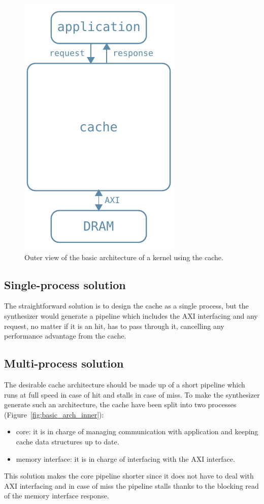 \documentclass[11pt,a4paper]{memoir}
\begin{document}
\begin{figure}
	\centering
	\includegraphics[width=.3\textwidth]{basic_arch}
	\caption{Outer view of the basic architecture of a kernel using the cache.}
	\label{fig:basic_arch}
\end{figure}

\subsection{Single-process solution}
The straightforward solution is to design the cache as a single process, but
the synthesizer would generate a pipeline which includes the AXI interfacing and
any request, no matter if it is an hit, has to pass through it, cancelling any
performance advantage from the cache.

\subsection{Multi-process solution}
The desirable cache architecture should be made up of a short pipeline which
runs at full speed in case of hit and stalls in case of miss.
To make the synthesizer generate such an architecture, the cache have been split
into two processes (Figure~\ref{fig:basic_arch_inner}):
\begin{itemize}
	\item core: it is in charge of managing communication with application
		and keeping cache data structures up to date.
	\item memory interface: it is in charge of interfacing with the AXI
		interface.
\end{itemize}

This solution makes the core pipeline shorter since it does not have to deal
with AXI interfacing and in case of miss the pipeline stalls thanks to the
blocking read of the memory interface response.
\end{document}
